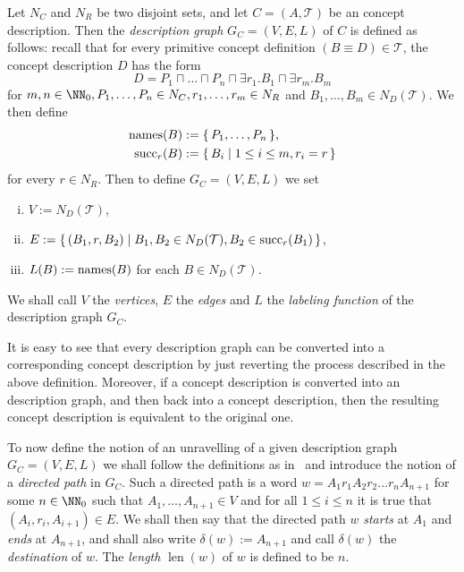 \begin{Definition}
  \label{def:EL-description-graph}
  Let $N_C$ and $N_R$ be two disjoint sets, and let $C = (A, \mathcal{T})$ be an \ELgfp
  concept description.  Then the \emph{\EL description graph} $G_C = (V, E, L)$ of $C$ is
  defined as follows: recall that for every primitive concept definition $(B \equiv D) \in
  \mathcal{T}$, the concept description $D$ has the form
  \begin{equation*}
    D = P_1 \sqcap \dots \sqcap P_n \sqcap \exists r_1. B_1 \sqcap \exists r_m. B_m
  \end{equation*}
  for $m, n \in \NN_0, P_1, \dots, P_n \in N_C, r_1, \dots, r_m \in N_R$ and $B_1, \dots,
  B_m \in N_D(\mathcal{T})$.  We then define
  \begin{align*}
    \operatorname{names}(B) &:= {\{\, P_1, \dots, P_n \,\}},\\
    \operatorname{succ}_r(B) &:= {\{\, B_i \mid 1 \leq i \leq m, r_i = r \,\}}
  \end{align*}
  for every $r \in N_R$.  Then to define $G_C = (V, E, L)$ we set
  \begin{enumerate}[i. ]
  \item $V := N_D(\mathcal{T})$,
  \item $E := {\{\, (B_1, r, B_2) \mid B_1, B_2 \in N_D(\mathcal{T}), B_2 \in
      \operatorname{succ}_r(B_1) \,\}}$,
  \item $L(B) := \operatorname{names}(B)$ for each $B \in N_D(\mathcal{T})$.
  \end{enumerate}
  We shall call $V$ the \emph{vertices}, $E$ the \emph{edges} and $L$ the \emph{labeling
    function} of the description graph $G_C$.
\end{Definition}

It is easy to see that every \EL description graph can be converted into a corresponding
concept description by just reverting the process described in the above definition.
Moreover, if a concept description is converted into an \EL description graph, and then
back into a concept description, then the resulting concept description is equivalent to
the original one.

To now define the notion of an unravelling of a given \EL description graph $G_C = (V, E,
L)$ we shall follow the definitions as in~\cite{Diss-Felix} and introduce the notion of a
\emph{directed path} in $G_C$.  Such a directed path is a word $w = A_1 r_1 A_2 r_2 \dots
r_n A_{n+1}$ for some $n \in \NN_0$ such that $A_1, \dots, A_{n+1} \in V$ and for all $1
\leq i \leq n$ it is true that $(A_i, r_i, A_{i+1}) \in E$.  We shall then say that the
directed path $w$ \emph{starts} at $A_1$ and \emph{ends} at $A_{n+1}$, and shall also
write $\delta(w) := A_{n+1}$ and call $\delta(w)$ the \emph{destination} of $w$.  The
\emph{length} $\operatorname{len}(w)$ of $w$ is defined to be $n$.

